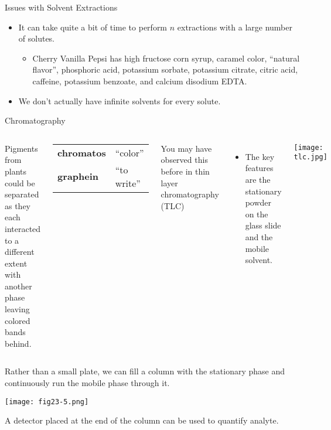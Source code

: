 \documentclass[notes=only]{beamer}
\begin{document}
\begin{frame}{Issues with Solvent Extractions}
	\begin{itemize}
		\item It can take quite a bit of time to perform $n$ extractions
			with a large number of solutes.
			\begin{itemize}
				\item Cherry Vanilla Pepsi has high fructose
					corn syrup, caramel color, ``natural
					flavor'', phosphoric acid, potassium
					sorbate, potassium citrate, citric acid,
					caffeine, potassium benzoate, and
					calcium disodium EDTA. 
			\end{itemize}
		\item We don't actually have infinite solvents for every solute.
%
%
	\end{itemize}
\end{frame}

\begin{frame}[allowframebreaks=1]{Chromatography}
	\begin{columns}
		Pigments from plants could be separated as
			they each interacted to a different extent with another
			phase leaving colored bands behind.
			\begin{center}
				\begin{tabular} {>{\bfseries}l l}
					chromatos & ``color'' \\
					graphein & ``to write''
				\end{tabular}
			\end{center}
		You may have observed this before in thin layer
			chromatography (TLC)
				\begin{itemize}
					\item The key features are the
						\alert{stationary} powder on the
						glass slide and the
						\alert{mobile} solvent.
				\end{itemize}
		\texttt{[image: tlc.jpg]}
	\end{columns}

	\framebreak

		Rather than a small plate, we can fill a column with the
			\alert{stationary phase} and continuously run the
			\alert{mobile phase} through it.
			\begin{center}
		\texttt{[image: fig23-5.png]}
			\end{center}
		A detector placed at the end of the column can be used to
			quantify analyte.
\end{frame}
\end{document}
